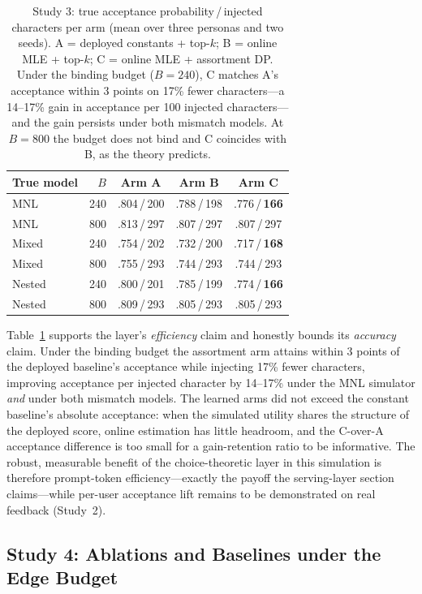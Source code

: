 \documentclass[letterpaper]{article}
\begin{document}
\begin{table}[t]
\centering
\small
\begin{tabular}{@{}lrccc@{}}
\toprule
True model & $B$ & Arm A & Arm B & Arm C \\
\midrule
MNL    & 240 & .804\,/\,200 & .788\,/\,198 & .776\,/\,\textbf{166} \\
MNL    & 800 & .813\,/\,297 & .807\,/\,297 & .807\,/\,297 \\
Mixed  & 240 & .754\,/\,202 & .732\,/\,200 & .717\,/\,\textbf{168} \\
Mixed  & 800 & .755\,/\,293 & .744\,/\,293 & .744\,/\,293 \\
Nested & 240 & .800\,/\,201 & .785\,/\,199 & .774\,/\,\textbf{166} \\
Nested & 800 & .809\,/\,293 & .805\,/\,293 & .805\,/\,293 \\
\bottomrule
\end{tabular}
\caption{Study 3: true acceptance probability\,/\,injected characters
per arm (mean over three personas and two seeds). A = deployed constants
+ top-$k$; B = online MLE + top-$k$; C = online MLE + assortment DP.
Under the binding budget ($B{=}240$), C matches A's acceptance within 3
points on 17\% fewer characters---a 14--17\% gain in acceptance per 100
injected characters---and the gain persists under both mismatch models.
At $B{=}800$ the budget does not bind and C coincides with B, as the
theory predicts.}
\label{tab:study3}
\end{table}

Table~\ref{tab:study3} supports the layer's \emph{efficiency} claim and
honestly bounds its \emph{accuracy} claim. Under the binding budget the
assortment arm attains within 3 points of the deployed baseline's
acceptance while injecting 17\% fewer characters, improving acceptance
per injected character by 14--17\% under the MNL simulator \emph{and}
under both mismatch models. The learned arms did not exceed the constant
baseline's absolute acceptance: when the simulated utility shares the
structure of the deployed score, online estimation has little headroom,
and the C-over-A acceptance difference is too small for a gain-retention
ratio to be informative. The robust, measurable benefit of the
choice-theoretic layer in this simulation is therefore prompt-token
efficiency---exactly the payoff the serving-layer section claims---while
per-user acceptance lift remains to be demonstrated on real feedback
(Study~2).

\subsection{Study 4: Ablations and Baselines under the Edge Budget}
\end{document}
